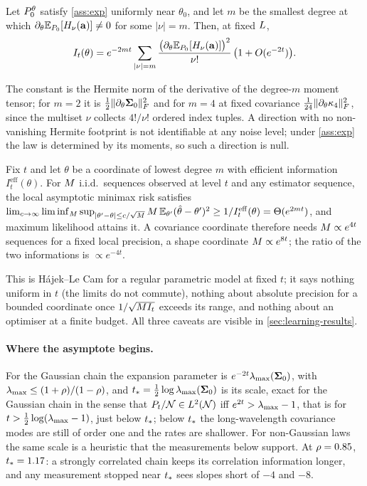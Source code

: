 \begin{theorem}
\label{thm:general}
Let $P_0^\theta$ satisfy \cref{ass:exp} uniformly near $\theta_0$, and let $m$ be the
smallest degree at which $\partial_\theta\mathbb{E}_{P_0}[H_\nu(\mathbf{a})]\neq0$ for some $|\nu|=m$.
Then, at fixed $L$,
\[
  I_t(\theta)=e^{-2mt}\sum_{|\nu|=m}\frac{\bigl(\partial_\theta\mathbb{E}_{P_0}[H_\nu(\mathbf{a})]\bigr)^2}{\nu!}
  \,\bigl(1+O(e^{-2t})\bigr).
\]
\end{theorem}
The constant is the Hermite norm of the derivative of the degree-$m$ moment tensor; for
$m=2$ it is $\tfrac12\lVert \partial_\theta\mathbf{\Sigma}_0 \rVert_{F}^2$ and for $m=4$ at fixed covariance
$\tfrac1{24}\lVert \partial_\theta\kappa_4 \rVert_{F}^2$, since the multiset $\nu$ collects $4!/\nu!$
ordered index tuples. A direction with no non-vanishing Hermite footprint is not
identifiable at any noise level; under \cref{ass:exp} the law is determined by its
moments, so such a direction is null.

\begin{corollary}
\label{cor:samples}
Fix $t$ and let $\theta$ be a coordinate of lowest degree $m$ with efficient information
$I_t^{\mathrm{eff}}(\theta)$. For $M$ i.i.d.\ sequences observed at level $t$ and any
estimator sequence, the local asymptotic minimax risk satisfies
$\lim_{c\to\infty}\liminf_{M}\sup_{|\theta'-\theta|\le c/\sqrt{M}}M\,\mathbb{E}_{\theta'}(\hat\theta-\theta')^2\ge1/I_t^{\mathrm{eff}}(\theta)=\Theta(e^{2mt})$,
and maximum likelihood attains it. A covariance coordinate therefore needs
$M\propto e^{4t}$ sequences for a fixed local precision, a shape coordinate
$M\propto e^{8t}$; the ratio of the two informations is $\propto e^{-4t}$.
\end{corollary}
This is H\'ajek--Le Cam for a regular parametric model at fixed $t$; it says nothing
uniform in $t$ (the limits do not commute), nothing about absolute precision for a bounded
coordinate once $1/\sqrt{M I_t}$ exceeds its range, and nothing about an optimiser
at a finite budget. All three caveats are visible in \cref{sec:learning-results}.

\paragraph{Where the asymptote begins.}
For the Gaussian chain the expansion parameter is $e^{-2t}\lambda_{\max}(\mathbf{\Sigma}_0)$, with
$\lambda_{\max}\le(1+\rho)/(1-\rho)$, and $t_\ast=\tfrac12\log\lambda_{\max}(\mathbf{\Sigma}_0)$ is its scale, exact
for the Gaussian chain in the sense that $P_t/\mathcal{N}\in L^2(\mathcal{N})$ iff $e^{2t}>\lambda_{\max}-1$,
that is for $t>\tfrac12\log(\lambda_{\max}-1)$, just below $t_\ast$; below $t_\ast$ the long-wavelength
covariance modes are still of order one and the rates are shallower. For non-Gaussian
laws the same scale is a heuristic that the measurements below support. At $\rho=0.85$,
$t_\ast=1.17$: a strongly correlated chain keeps its correlation
information longer, and any measurement stopped near $t_\ast$ sees slopes short of
$-4$ and $-8$.

